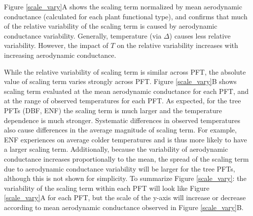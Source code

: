 \documentclass[draft,linenumbers]{agujournal}
\begin{document}
Figure \ref{scale_vary}A shows the scaling term normalized by mean aerodynamic conductance (calculated for each plant functional type), and confirms that much of the relative variability of the scaling term is caused by aerodynamic conductance variability. Generally, temperature (via $\Delta$) causes less relative variability. However, the impact of $T$ on the relative variability increases with increasing aerodynamic conductance. 

While the relative variability of scaling term is similar across PFT, the absolute value of scaling term varies strongly across PFT. Figure \ref{scale_vary}B shows scaling term evaluated at the mean aerodynamic conductance for each PFT, and at the range of observed temperatures for each PFT. As expected, for the tree PFTs (DBF, ENF) the scaling term is much larger and the temperature dependence is much stronger. Systematic differences in observed temperatures also cause differences in the average magnitude of scaling term. For example, ENF experiences on average colder temperatures and is thus more likely to have a larger scaling term. Additionally, because the variability of aerodynamic conductance increases proportionally to the mean, the spread of the scaling term due to aerodynamic conductance variability will be larger for the tree PFTs, although this is not shown for simplicity. To summarize Figure \ref{scale_vary}: the variability of the scaling term within each PFT will look like Figure \ref{scale_vary}A for each PFT, but the scale of the y-axis will increase or decrease according to mean aerodynamic conductance observed in Figure \ref{scale_vary}B.
 
\end{document}
